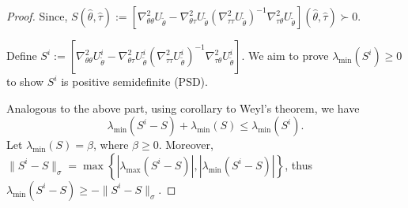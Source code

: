 \documentclass{article}
\theoremstyle{definition}
\begin{document}
\begin{proof}
\noindent Since,
$ S(\hat\theta,\hat\tau):=\left[\nabla_{\theta\theta}^2U_{\tilde\theta}-\nabla_{\theta\tau}^2U_{\tilde\theta}\left(\nabla_{\tau\tau}^2U_{\tilde\theta}\right)^{-1}\nabla_{\tau\theta}^2U_{\tilde\theta}\right](\hat\theta,\hat\tau)\succ 0.$ 

Define $S^i:=\left[\nabla_{\theta\theta}^2U_{\tilde\theta}^i-\nabla_{\theta\tau}^2U_{\tilde\theta}^i\left(\nabla_{\tau\tau}^2U_{\tilde\theta}^i\right)^{-1}\nabla_{\tau\theta}^2U_{\tilde\theta}^i\right]$. We aim to prove $\lambda_{\min}(S^i)\geq0$ to show $S^i$ is positive semidefinite (PSD).

\noindent Analogous to the above part, using corollary to Weyl's theorem, we have
\begin{equation*}
\lambda_{\min}(S^i-S)+\lambda_{\min}(S)\leq   \lambda_{\min}(S^i).
\end{equation*}
Let $\lambda_{\min}(S)=\beta$, where $\beta\ge 0$. Moreover, $\|S^i-S\|_{\sigma}=\max\left\{\left\vert\lambda_{\max}(S^i-S)\right\vert, \left\vert\lambda_{\min}(S^i-S)\right\vert\right\}$, thus $\lambda_{\min}(S^i-S)\geq -\|S^i-S\|_{\sigma}$.


\end{proof}
\end{document}
